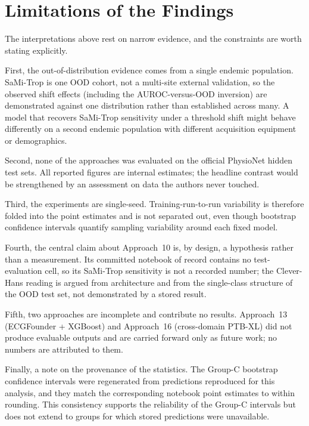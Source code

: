 \section{Limitations of the Findings}
\label{sec:discussion_limitations}

The interpretations above rest on narrow evidence, and the constraints are worth stating explicitly.

First, the out-of-distribution evidence comes from a single endemic population. SaMi-Trop is one OOD cohort, not a multi-site external validation, so the observed shift effects (including the AUROC-versus-OOD inversion) are demonstrated against one distribution rather than established across many. A model that recovers SaMi-Trop sensitivity under a threshold shift might behave differently on a second endemic population with different acquisition equipment or demographics.

Second, none of the approaches was evaluated on the official PhysioNet hidden test sets. All reported figures are internal estimates; the headline contrast would be strengthened by an assessment on data the authors never touched.

Third, the experiments are single-seed. Training-run-to-run variability is therefore folded into the point estimates and is not separated out, even though bootstrap confidence intervals quantify sampling variability around each fixed model.

Fourth, the central claim about Approach~10 is, by design, a hypothesis rather than a measurement. Its committed notebook of record contains no test-evaluation cell, so its SaMi-Trop sensitivity is not a recorded number; the Clever-Hans reading is argued from architecture and from the single-class structure of the OOD test set, not demonstrated by a stored result.

Fifth, two approaches are incomplete and contribute no results. Approach~13 (ECGFounder + XGBoost) and Approach~16 (cross-domain PTB-XL) did not produce evaluable outputs and are carried forward only as future work; no numbers are attributed to them.

Finally, a note on the provenance of the statistics. The Group-C bootstrap confidence intervals were regenerated from predictions reproduced for this analysis, and they match the corresponding notebook point estimates to within rounding. This consistency supports the reliability of the Group-C intervals but does not extend to groups for which stored predictions were unavailable.

